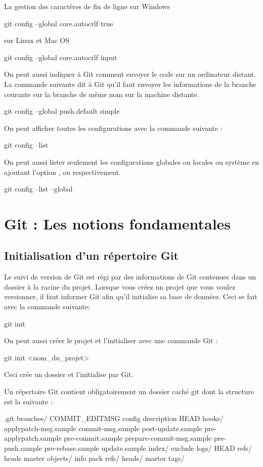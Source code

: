 \documentclass[11pt, a4paper]{book}
\begin{document}
La gestion des caractères de fin de ligne sur Windows
\begin{bash}
git config --global core.autocrlf true
\end{bash}
sur Linux et Mac OS
\begin{bash}
git config --global core.autocrlf input
\end{bash}
On peut aussi indiquer à Git comment envoyer le code sur un ordinateur distant. La commande suivante dit à Git qu'il faut envoyer les informations de la branche courante sur la branche de même nom sur la machine distante.
\begin{bash}
git config --global push.default simple
\end{bash}

On peut afficher toutes les configurations avec la commande suivante :
\begin{bash}
git config --list
\end{bash}
On peut aussi lister seulement les configurations globales ou locales ou système en ajoutant l'option ,  ou  respectivement.
\begin{bash}
git config --list --global 
\end{bash}
\chapter{Git :  Les notions fondamentales}
\section{Initialisation d'un répertoire Git}
Le suivi de version de Git est régi par des informations de Git contenues dans un dossier  à la racine du projet. Lorsque vous créez un projet que vous voulez versionner, il faut informer Git afin qu'il initialise sa base de données. Ceci se fait avec la commande suivante:
\begin{bash}
git init
\end{bash}

On peut aussi créer le projet et l'initialiser avec une commande Git :
\begin{bash}
git init <nom_du_projet>
\end{bash}
Ceci crée un dossier et l'initialise par Git. 

Un répertoire Git contient obligatoirement un dossier caché git dont la structure est la suivante :

\begin{bash}
.git
    branches/
    COMMIT_EDITMSG
    config
    description
    HEAD
    hooks/
        applypatch-msg.sample
        commit-msg.sample
        post-update.sample
        pre-applypatch.sample
        pre-commit.sample
        prepare-commit-msg.sample
        pre-push.sample
        pre-rebase.sample
        update.sample
    index/
        exclude
    logs/
        HEAD
        refs/
            heads
                master
    objects/
        info
        pack
    refs/
        heads/
            master
        tags/
\end{bash}
\end{document}
